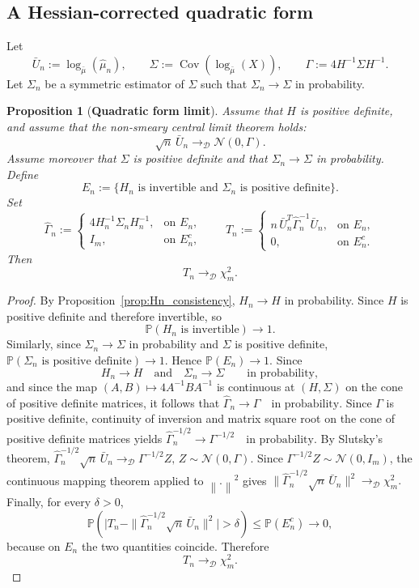 \documentclass{amsart}
\newtheorem{proposition}[theorem]{Proposition}
\theoremstyle{definition}
\theoremstyle{remark}
\newcommand{\norm}[1]{\left\lVert#1\right\rVert}
\newcommand\0{\boldsymbol{0}}
\begin{document}
\subsection{A Hessian-corrected quadratic form}

\noindent
Let
\[
\bar U_n:=\log_{\bar{\mu}}(\hat{\mu}_n),
\qquad
\Sigma:=\operatorname{Cov}(\log_{\bar{\mu}}(X)),
\qquad
\Gamma:=4H^{-1}\Sigma H^{-1}.
\]
Let $\Sigma_n$ be a symmetric estimator of $\Sigma$ such that $\Sigma_n\to\Sigma$ in probability.

\begin{proposition}[\textbf{Quadratic form limit}]
\label{prop:quadratic_chisq}
Assume that $H$ is positive definite, and assume that the non-smeary central limit theorem holds:
\[
\sqrt n\,\bar U_n \rightarrow_{\mathcal D}\mathcal N(0,\Gamma).
\]
Assume moreover that $\Sigma$ is positive definite and that $\Sigma_n\to\Sigma$ in probability. Define
\[
E_n:=\{H_n \text{ is invertible and } \Sigma_n \text{ is positive definite}\}.
\]
Set
\begin{equation}\label{eqn:Gamma-n,T-n}
\widehat\Gamma_n:=
\begin{cases}
4H_n^{-1}\Sigma_n H_n^{-1}, & \text{on }E_n,\\
I_m, & \text{on }E_n^c,
\end{cases}
\qquad
T_n:=
\begin{cases}
n\,\bar U_n^{T}\widehat\Gamma_n^{-1}\bar U_n, & \text{on }E_n,\\
0, & \text{on }E_n^c.
\end{cases}
\end{equation}
Then
\[
T_n\rightarrow_{\mathcal D}\chi_m^2.
\]
\end{proposition}

\begin{proof}
By Proposition~\ref{prop:Hn_consistency}, $H_n\to H$ in probability. Since $H$ is positive definite and therefore invertible, so
\[
\mathbb P(H_n \text{ is invertible})\to 1.
\]
Similarly, since $\Sigma_n\to\Sigma$ in probability and $\Sigma$ is positive definite,
\(
\mathbb P(\Sigma_n \text{ is positive definite})\to 1.
\)
Hence
\(
\mathbb P(E_n)\to 1.
\)
Since
\[
H_n\to H
\quad\text{and}\quad
\Sigma_n\to\Sigma
\qquad\text{in probability},
\]
and since the map
\(
(A,B)\mapsto 4A^{-1}BA^{-1}
\)
is continuous at $(H,\Sigma)$ on the cone of positive definite matrices, it follows that
\(
\widehat\Gamma_n\to\Gamma
\quad\text{in probability}.
\)
Since $\Gamma$ is positive definite, continuity of inversion and matrix square root on the cone of positive definite matrices yields
\(
\widehat\Gamma_n^{-1/2}\to \Gamma^{-1/2}
\quad\text{in probability}.
\)
By Slutsky's theorem,
\(
\widehat\Gamma_n^{-1/2}\sqrt n\,\bar U_n
\rightarrow_{\mathcal D}
\Gamma^{-1/2}Z,
\, Z\sim\mathcal N(0,\Gamma).
\)
Since $\Gamma^{-1/2}Z\sim\mathcal N(0,I_m)$, the continuous mapping theorem applied to $\norm{.}^2$ gives
\(
\bigl\|\widehat\Gamma_n^{-1/2}\sqrt n\,\bar U_n\bigr\|^2
\rightarrow_{\mathcal D}\chi_m^2.
\)
Finally, for every $\delta>0$,
\[
\mathbb P\!\left(
\bigl|T_n-\|\widehat\Gamma_n^{-1/2}\sqrt n\,\bar U_n\|^2\bigr|>\delta
\right)
\le \mathbb P(E_n^c)\to 0,
\]
because on $E_n$ the two quantities coincide. Therefore
\[
T_n\rightarrow_{\mathcal D}\chi_m^2.
\]
\end{proof}
\end{document}

